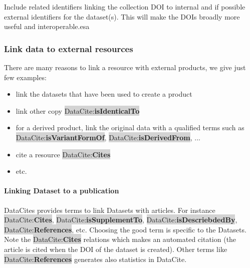 \documentclass[11pt,a4paper]{ivoa}
\newcommand{\dataciteterm}[1]{\colorbox{lightgray}{DataCite:\textbf{#1}}}
\begin{document}


Include related identifiers linking the collection DOI to internal and if possible external identifiers for the dataset(s). 
This will make the DOIs broadly more useful and interoperable.esa


\subsubsection{Link data to external resources}
There are many reasons to link a resource with external products, we give just few examples:

\begin{itemize}
	\item link the datasets that have been used to create a product 
	\item link other copy \dataciteterm{isIdenticalTo}
	\item for a derived product, link the original data with a qualified terms such as \dataciteterm{isVariantFormOf}, \dataciteterm{isDerivedFrom}, ...
	\item cite a resource \dataciteterm{Cites}
	\item etc.
\end{itemize}



\paragraph{Linking Dataset to a publication}
DataCites provides terms to link Datasets with articles. For instance \dataciteterm{Cites}, \dataciteterm{isSupplementTo}, \dataciteterm{isDescriebdedBy}, \dataciteterm{References}, etc.
Choosing the good term is specific to the Datasets. \\


Note the \dataciteterm{Cites} relations which makes an automated citation (the article is cited when the DOI of the dataset is created). 
Other terms like \dataciteterm{References} generates also statistics in DataCite.


\end{document}
